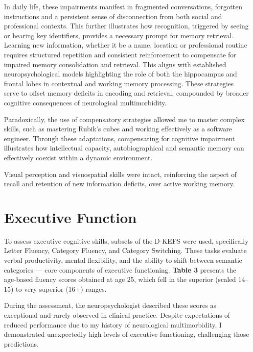 \documentclass{article}
\begin{document}
In daily life, these impairments manifest in fragmented conversations, forgotten instructions and a persistent sense of disconnection from both social and professional contexts. This further illustrates how recognition, triggered by seeing or hearing key identifiers, provides a necessary prompt for memory retrieval. Learning new information, whether it be a name, location or professional routine requires structured repetition and consistent reinforcement to compensate for impaired memory consolidation and retrieval. This aligns with established neuropsychological models highlighting the role of both the hippocampus and frontal lobes in contextual and working memory processing.\cite{eichenbaum2017,stuss2000} These strategies serve to offset memory deficits in encoding and retrieval, compounded by broader cognitive consequences of neurological multimorbidity.\cite{lezak2012,feinstein2011} 

Paradoxically, the use of compensatory strategies allowed me to master complex skills, such as mastering Rubik’s cubes and working effectively as a software engineer. Through these adaptations, compensating for cognitive impairment illustrates how intellectual capacity, autobiographical and semantic memory can effectively coexist within a dynamic environment.

Visual perception and visuospatial skills were intact, reinforcing the aspect of recall and retention of new information deficits, over active working memory.

\section*{Executive Function}

To assess executive cognitive skills, subsets of the D-KEFS were used, specifically Letter Fluency, Category Fluency, and Category Switching. These tasks evaluate verbal productivity, mental flexibility, and the ability to shift between semantic categories — core components of executive functioning. \textbf{Table 3} presents the age-based fluency scores obtained at age 25, which fell in the superior (scaled 14–15) to very superior (16+) ranges.



During the assessment, the neuropsychologist described these scores as exceptional and rarely observed in clinical practice. Despite expectations of reduced performance due to my history of neurological multimorbidity, I demonstrated unexpectedly high levels of executive functioning, challenging those predictions.
\end{document}
